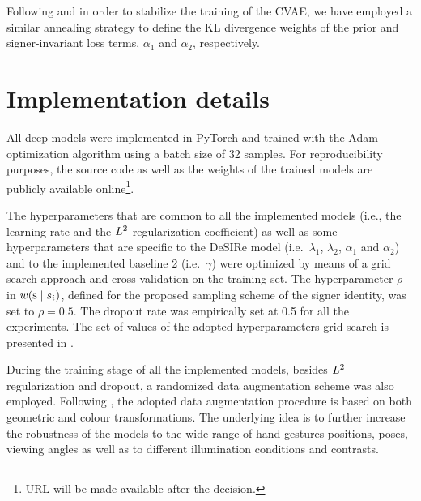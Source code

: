 Following \citet{Bowman2015} and in order to stabilize the training of the CVAE, we have employed a similar annealing strategy to define the KL divergence weights of the prior and signer-invariant loss terms, $\alpha_1$ and $\alpha_2$, respectively.

\section{Implementation details}
All deep models were implemented in PyTorch and trained with the Adam optimization algorithm using a batch size of 32 samples. For reproducibility purposes, the source code as well as the weights of the trained models are publicly available online\footnote{URL will be made available after the decision.}.

The hyperparameters that are common to all the implemented models (i.e., the learning rate and the $L^2$ regularization coefficient) as well as some hyperparameters that are specific to the DeSIRe model (i.e.\ $\lambda_{1}$, $\lambda_{2}$, $\alpha_{1}$ and $\alpha_{2}$) and to the implemented baseline 2 (i.e.\ $\gamma$) were optimized by means of a grid search approach and cross-validation on the training set. The hyperparameter $\rho$ in $w({\textnormal{s}} \mid s_{i})$, defined for the proposed sampling scheme of the signer identity, was set to $\rho=0.5$. The dropout rate was empirically set at 0.5 for all the experiments. The set of values of the adopted hyperparameters grid search is presented in .

During the training stage of all the implemented models, besides $L^2$ regularization and dropout, a randomized data augmentation scheme was also employed. Following \citet{Ferreira2018}, the adopted data augmentation procedure is based on both geometric and colour transformations. The underlying idea is to further increase the robustness of the models to the wide range of hand gestures positions, poses, viewing angles as well as to different illumination conditions and contrasts.

